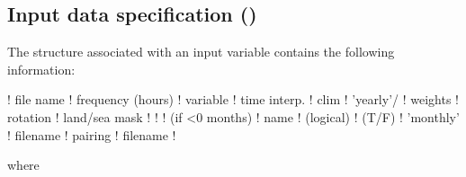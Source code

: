 \documentclass[../tex_main/NEMO_manual]{subfiles}
\begin{document}
\subsection{Input data specification (\protect{})}
\label{subsec:SBC_fldread}

The structure associated with an input variable contains the following information:
\begin{forlines}
!  file name  ! frequency (hours) ! variable  ! time interp. !  clim  ! 'yearly'/ ! weights  ! rotation ! land/sea mask ! 
!             !  (if <0  months)  !   name    !   (logical)  !  (T/F) ! 'monthly' ! filename ! pairing  ! filename      !
\end{forlines}
where 
\end{document}
